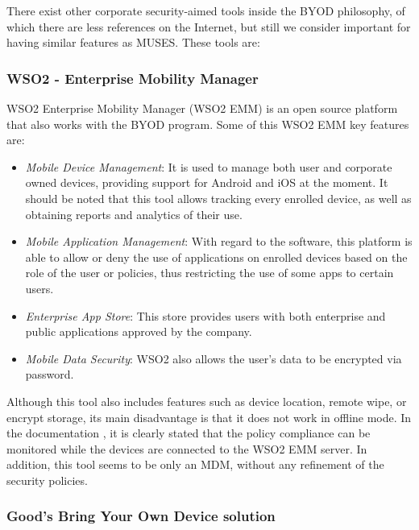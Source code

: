 There exist other corporate security-aimed tools inside the BYOD philosophy, of which there are less references on the Internet, but still we consider important for having similar features as MUSES. These tools are:

\subsubsection{WSO2 - Enterprise Mobility Manager}

WSO2 Enterprise Mobility Manager (WSO2 EMM) \cite{WSO2_tool} is an open source platform that also works with the BYOD program. Some of this WSO2 EMM key features are:

\begin{itemize}
  \item \textit{Mobile Device Management}: It is used to manage both user and corporate owned devices, providing support for Android and iOS at the moment. It should be noted that this tool allows tracking every enrolled device, as well as obtaining reports and analytics of their use.
  \item \textit{Mobile Application Management}: With regard to the software, this platform is able to allow or deny the use of applications on enrolled devices based on the role of the user or policies, thus restricting the use of some apps to certain users.
  \item \textit{Enterprise App Store}: This store provides users with both enterprise and public applications approved by the company.
  \item \textit{Mobile Data Security}: WSO2 also allows the user's data to be encrypted via password.
\end{itemize}

Although this tool also includes features such as device location, remote wipe, or encrypt storage, its main disadvantage is that it does not work in offline mode. In the documentation \cite{wso2Pol}, it is clearly stated that the policy compliance can be monitored while the devices are connected to the WSO2 EMM server. In addition, this tool seems to be only an MDM, without any refinement of the security policies.

\subsubsection{Good's Bring Your Own Device solution}

